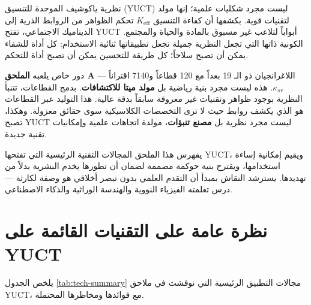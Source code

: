 \documentclass[12pt,a4paper]{article}
\theoremstyle{remark}
\newcommand{\Keff}{K_{\mathrm{eff}}}
\begin{document}
	نظرية ياكوشيف الموحدة للتنسيق (YUCT) ليست مجرد شكليات علمية؛ إنها مولد لتقنيات قوية. بكشفها أن كفاءة التنسيق \(\Keff\) تحكم الظواهر من الروابط الذرية إلى الديناميك الاجتماعي، تفتح YUCT أبواباً لتلاعب غير مسبوق بالمادة والحياة والمجتمع. الكونية ذاتها التي تجعل النظرية جميلة تجعل تطبيقاتها ثنائية الاستخدام: كل أداة للشفاء يمكن أن تصبح سلاحاً؛ كل طريقة للتحسين يمكن أن تصبح أداة للتحكم.
	
	دور خاص يلعبه \textbf{الملحق A} — اللاغرانجيان ذو الـ 19 بعداً مع 120 قطاعاً و7140 اقتراناً \(\kappa_{sr}\). هذه ليست مجرد بنية رياضية بل \textbf{مولد ميتا للاكتشافات}. بدمج القطاعات، تتنبأ النظرية بوجود ظواهر وتقنيات غير معروفة سابقاً بدقة عالية. هذا التوليد عبر القطاعات هو الذي يكشف روابط حيث لا ترى التخصصات الكلاسيكية سوى حقائق معزولة. وهكذا، تصبح YUCT ليست مجرد نظرية بل \textbf{مصنع تنبؤات}، مولدة اتجاهات علمية وإمكانيات تقنية جديدة.
	
	يفهرس هذا الملحق المجالات التقنية الرئيسية التي تفتحها YUCT، ويقيم إمكانية إساءة استخدامها، ويقترح بنية حوكمة مصممة لضمان أن تطورها يخدم البشرية بدلاً من تهديدها. يسترشد النقاش بمبدأ أن التقدم العلمي بدون تبصر أخلاقي هو وصفة لكارثة — درس تعلمته الفيزياء النووية والهندسة الوراثية والذكاء الاصطناعي.
	
	\section{نظرة عامة على التقنيات القائمة على YUCT}
	\label{sec:overview}
	
	يلخص الجدول \ref{tab:tech-summary} مجالات التطبيق الرئيسية التي نوقشت في ملاحق YUCT، مع فوائدها ومخاطرها المحتملة.
	
\end{document}
